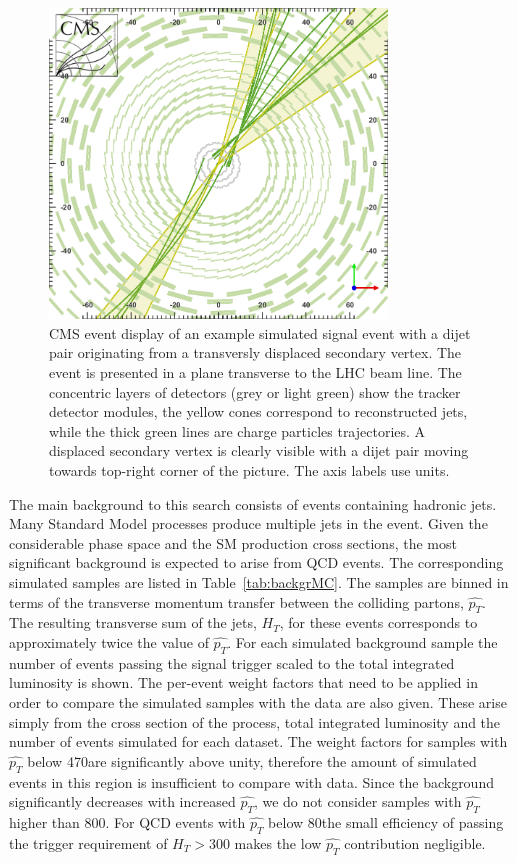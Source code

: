 \begin{figure}[htbp]
\centering
 \includegraphics[width=0.8\textwidth]{plots/eventDisplay.png}
\caption{CMS event display of an example simulated signal event with a dijet pair originating from a transversly displaced secondary vertex.
The event is presented in a plane transverse to the LHC beam line.
The concentric layers of detectors (grey or light green) show the tracker detector modules, the
yellow cones correspond to reconstructed jets, while the thick green lines are charge particles
trajectories. A displaced secondary vertex is clearly visible with a dijet pair moving towards
top-right corner of the picture.
The axis labels use \cm units. \label{fig:eventDisplay}}
\end{figure}


The main background to this search consists of events containing hadronic jets. Many Standard Model processes
produce multiple jets in the event. Given the considerable phase space and the SM production 
cross sections,
 the most significant background 
is expected to arise from QCD events. The corresponding simulated samples
are listed in Table~\ref{tab:backgrMC}. The samples are binned in terms
of the transverse momentum transfer between the colliding partons, $\hat{p_T}$.
The resulting transverse sum
of the jets, $H_T$, for these events corresponds to approximately twice the value of $\hat{p_T}$. 
For each simulated background sample the number of events passing the signal trigger
scaled to the total integrated luminosity is shown. The per-event weight factors that need 
to be applied in order to compare the simulated samples with the data are also given. These
arise simply from the cross section of the process, total integrated luminosity and the number
of events simulated for each dataset.
The weight factors for samples with $\hat{p_T}$
below 470\GeV are significantly above unity, therefore the amount of simulated events in this region is insufficient to compare with data.
Since the background significantly decreases with increased $\hat{p_T}$, we do not consider samples with $\hat{p_T}$ higher
than 800\GeV. For QCD events with $\hat{p_T}$ below 80\GeV the small efficiency of passing the trigger
 requirement of $H_T>$300\GeV
makes the low $\hat{p_T}$ contribution negligible.

